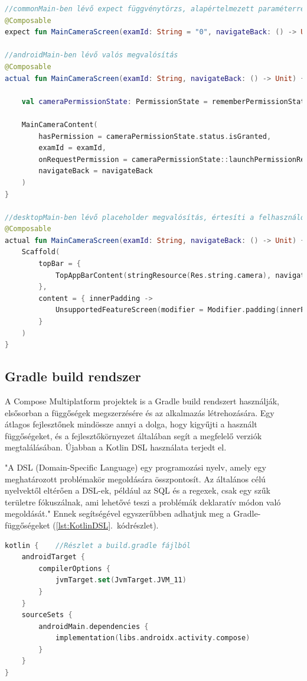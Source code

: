 \begin{lstlisting}[caption={Expect és actual használata}, label={lst:ExpectActual}, language=Kotlin]
//commonMain-ben lévő expect függvénytörzs, alapértelmezett paraméterrel.
@Composable
expect fun MainCameraScreen(examId: String = "0", navigateBack: () -> Unit)

//androidMain-ben lévő valós megvalósítás
@Composable
actual fun MainCameraScreen(examId: String, navigateBack: () -> Unit) {

    val cameraPermissionState: PermissionState = rememberPermissionState(android.Manifest.permission.CAMERA)

    MainCameraContent(
        hasPermission = cameraPermissionState.status.isGranted,
        examId = examId,
        onRequestPermission = cameraPermissionState::launchPermissionRequest,
        navigateBack = navigateBack
    )
}

//desktopMain-ben lévő placeholder megvalósítás, értesíti a felhasználót, hogy ez a funkció az eszközén nem támogatott
@Composable
actual fun MainCameraScreen(examId: String, navigateBack: () -> Unit) {
    Scaffold(
        topBar = {
            TopAppBarContent(stringResource(Res.string.camera), navigateBack)
        },
        content = { innerPadding ->
            UnsupportedFeatureScreen(modifier = Modifier.padding(innerPadding))
        }
    )
}
\end{lstlisting}

\subsection{Gradle build rendszer}

A Compose Multiplatform projektek is a Gradle build rendszert használják, elsősorban a függőségek megszerzésére és az alkalmazás létrehozására.  
Egy átlagos fejlesztőnek mindössze annyi a dolga, hogy kigyűjti a használt függőségeket, és a fejlesztőkörnyezet általában segít a megfelelő verziók megtalálásában.  
Újabban a Kotlin DSL használata terjedt el.

"A DSL (Domain-Specific Language) egy programozási nyelv, amely egy meghatározott problémakör megoldására összpontosít. Az általános célú nyelvektől eltérően a DSL-ek, például az SQL és a regexek, csak egy szűk területre fókuszálnak, ami lehetővé teszi a problémák deklaratív módon való megoldását."\cite{KotlinDSL}  
Ennek segítségével egyszerűbben adhatjuk meg a Gradle-függőségeket (\ref{lst:KotlinDSL}.~kódrészlet).

\begin{lstlisting}[caption={Kotlin DSL}, label={lst:KotlinDSL}, language=Kotlin]
kotlin {    //Részlet a build.gradle fájlból
    androidTarget {
        compilerOptions {
            jvmTarget.set(JvmTarget.JVM_11)
        }
    }
    sourceSets {
        androidMain.dependencies {
            implementation(libs.androidx.activity.compose)
        }
    }
}
\end{lstlisting}

